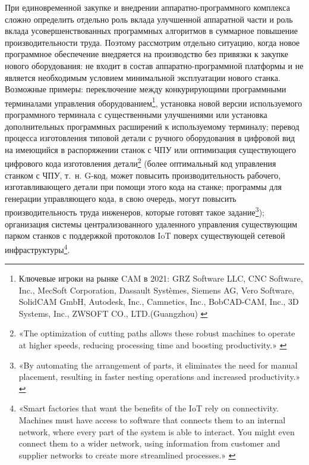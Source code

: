 \documentclass{article}
\begin{document}
При единовременной закупке и внедрении аппаратно-программного комплекса сложно определить отдельно роль вклада улучшенной аппаратной части и роль вклада усовершенствованных программных алгоритмов в суммарное повышение производительности труда. Поэтому рассмотрим отдельно ситуацию, когда новое программное обеспечение внедряется на производство без привязки к закупке нового оборудования: не входит в состав аппаратно-программной платформы и не является необходимым условием минимальной эксплуатации нового станка. Возможные примеры: переключение между конкурирующими программными терминалами управления оборудованием\footnote{Ключевые игроки на рынке CAM в 2021: GRZ Software LLC, CNC Software, Inc., MecSoft Corporation, Dassault Systèmes, Siemens AG, Vero Software, SolidCAM GmbH, Autodesk, Inc., Camnetics, Inc., BobCAD-CAM, Inc., 3D Systems, Inc., ZWSOFT CO., LTD.(Guangzhou) \cite{camMarketStatus2021}}, установка новой версии используемого программного терминала с существенными улучшениями или установка дополнительных программных расширений к используемому терминалу; перевод процесса изготовления типовой детали с ручного оборудования в цифровой вид на имеющийся в распоряжении станок с ЧПУ или оптимизация существующего цифрового кода изготовления детали\footnote{«The optimization of cutting paths allows these robust machines to operate at higher speeds, reducing processing time and boosting productivity.» \cite{nestingSoftOverview}} (более оптимальный код управления станком с ЧПУ, т.~н. G-код, может повысить производительность рабочего, изготавливающего детали при помощи этого кода на станке; программы для генерации управляющего кода, в свою очередь, могут повысить производительность труда инженеров, которые готовят такое задание\footnote{«By automating the arrangement of parts, it eliminates the need for manual placement, resulting in faster nesting operations and increased productivity.» \cite{autodeskNesting}}); организация системы централизованного удаленного управления существующим парком станков с поддержкой протоколов IoT поверх существующей сетевой инфраструктуры\footnote{«Smart factories that want the benefits of the IoT rely on connectivity. Machines must have access to software that connects them to an internal network, where every part of the system is able to interact. You might even connect them to a wider network, using information from customer and supplier networks to create more streamlined processes.» \cite{iotCncFactory}}.
\end{document}
